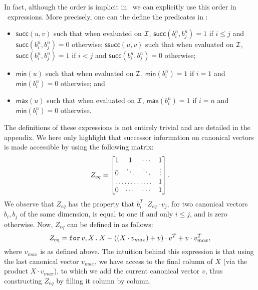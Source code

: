 In fact, although the order is implicit in \langfor\, we can explicitly use this order in \langfor\ expressions. More precisely, one can the define the predicates in \langfor:
\begin{itemize}
	\item $\mathsf{succ}(u,v)$ such that when evaluated on $\mathcal{I}$, $\mathsf{succ}(b_i^n,b_j^n)=1$ if $i\leq j$ and $\mathsf{succ}(b_i^n,b_j^n)=0$ otherwise;
	$\mathsf{ssucc}(u,v)$ such that when evaluated on $\mathcal{I}$, $\mathsf{succ}(b_i^n,b_j^n)=1$ if $i < j$ and $\mathsf{succ}(b_i^n,b_j^n)=0$ otherwise;
	\item $\mathsf{min}(u)$ such that when evaluated on $\mathcal{I}$, $\mathsf{min}(b_i^n)=1$ if $i=1$ and $\mathsf{min}(b_i^n)=0$ otherwise; and
	\item $\mathsf{max}(u)$ such that when evaluated on $\mathcal{I}$, $\mathsf{max}(b_i^n)=1$ if $i=n$ and $\mathsf{min}(b_i^n)=0$ otherwise.	
	\end{itemize}
The definitions of these expressions is not entirely trivial and are detailed in the appendix.
We here only highlight that successor information on canonical vectors is made accessible by
using the following matrix:
%
\[
Z_{eq} = \begin{bmatrix}
    1 & 1 & \cdots &  1 \\
    0 & \ddots & \ddots & \vdots \\
    \hdotsfor{3} & 1 \\
    0 & \cdots & \cdots & 1 
\end{bmatrix}.
\] 
We observe that $Z_{eq}$ has the property that $b_i^T\cdot Z_{eq} \cdot v_j$, for two canonical vectors $b_i,b_j$ of the same dimension, is equal to one if and only $i\leq j$, and is zero otherwise. Now, $Z_{eq}$ can be defined in \langfor as follows:
$$Z_{\text{eq}}=\texttt{for}\, v,X \texttt{.}\, X + \left((X\cdot v_{max}) + v \right)\cdot v^T + v\cdot v^T_{max},$$
where $v_{max}$ is as defined above. The intuition behind this expression is that using the last canonical vector $v_{max}$, we have access to the final column of $X$ (via the product $X\cdot v_{max}$), to which we add the current canonical vector $v$, thus constructing $Z_{eq}$ by filling it column by column.

